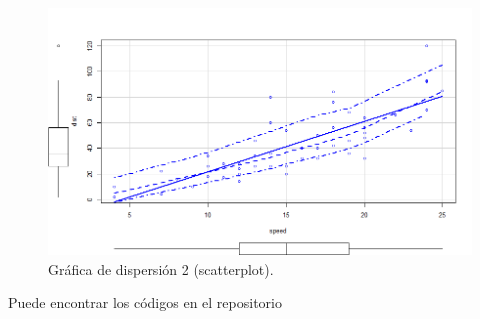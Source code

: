 \documentclass[12pt,a4paper]{article}
\begin{document}
\begin{figure}
\centering
\includegraphics[scale=0.5]{ScatterPlot2}
\caption{Gráfica de dispersión 2 (scatterplot).}
\label{fig:scatterplot2}
\end{figure}

\newpage
Puede encontrar los códigos en el repositorio \citep{repositorio}



\end{document}
